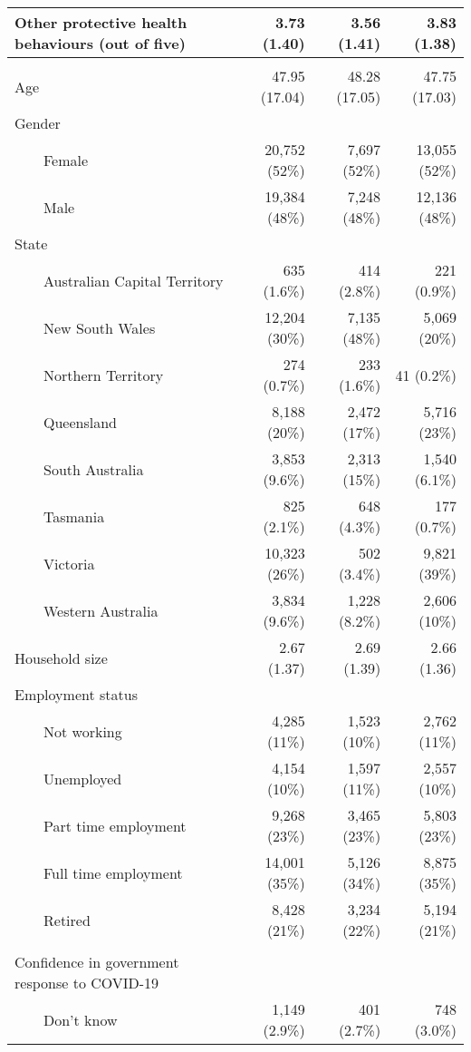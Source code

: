 \documentclass[
]{article}
\begin{document}
\begin{longtable}{lrrr}
Other protective health behaviours (out of five) & 3.73 (1.40) & 3.56 (1.41) & 3.83 (1.38) \\ 
\midrule\addlinespace[2.5pt]
\multicolumn{4}{l}{Demographics} \\ 
\midrule\addlinespace[2.5pt]
Age & 47.95 (17.04) & 48.28 (17.05) & 47.75 (17.03) \\ 
Gender &  &  &  \\ 
    Female & 20,752 (52\%) & 7,697 (52\%) & 13,055 (52\%) \\ 
    Male & 19,384 (48\%) & 7,248 (48\%) & 12,136 (48\%) \\ 
State &  &  &  \\ 
    Australian Capital Territory & 635 (1.6\%) & 414 (2.8\%) & 221 (0.9\%) \\ 
    New South Wales & 12,204 (30\%) & 7,135 (48\%) & 5,069 (20\%) \\ 
    Northern Territory & 274 (0.7\%) & 233 (1.6\%) & 41 (0.2\%) \\ 
    Queensland & 8,188 (20\%) & 2,472 (17\%) & 5,716 (23\%) \\ 
    South Australia & 3,853 (9.6\%) & 2,313 (15\%) & 1,540 (6.1\%) \\ 
    Tasmania & 825 (2.1\%) & 648 (4.3\%) & 177 (0.7\%) \\ 
    Victoria & 10,323 (26\%) & 502 (3.4\%) & 9,821 (39\%) \\ 
    Western Australia & 3,834 (9.6\%) & 1,228 (8.2\%) & 2,606 (10\%) \\ 
Household size & 2.67 (1.37) & 2.69 (1.39) & 2.66 (1.36) \\ 
Employment status &  &  &  \\ 
    Not working & 4,285 (11\%) & 1,523 (10\%) & 2,762 (11\%) \\ 
    Unemployed & 4,154 (10\%) & 1,597 (11\%) & 2,557 (10\%) \\ 
    Part time employment & 9,268 (23\%) & 3,465 (23\%) & 5,803 (23\%) \\ 
    Full time employment & 14,001 (35\%) & 5,126 (34\%) & 8,875 (35\%) \\ 
    Retired & 8,428 (21\%) & 3,234 (22\%) & 5,194 (21\%) \\ 
\midrule\addlinespace[2.5pt]
\multicolumn{4}{l}{Trust in government} \\ 
\midrule\addlinespace[2.5pt]
Confidence in government response to COVID-19 &  &  &  \\ 
    Don't know & 1,149 (2.9\%) & 401 (2.7\%) & 748 (3.0\%) \\ 

\end{longtable}
\end{document}
